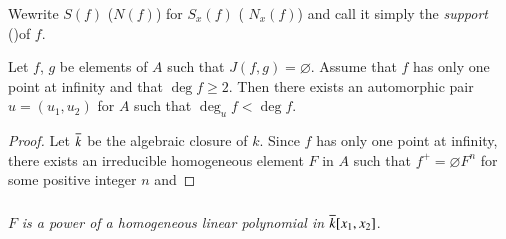 \begin{figure}[H]
\end{figure}
We\pageoriginale write $S(f)$ (\resp $N(f)$) for $S_x (f)$ (\resp
$N_x(f)$) and call it simply the {\em support} ()of $f$.

\setcounter{thm}{1}
\begin{thm}\label{part2:chap6:sec19:thm19.2}   
  Let $f$, $g$ be elements of $A$ such that $J(f, g)=
  \diameter$. Assume that $f$ has only one point at infinity and that
  $\deg f \geq 2$. Then there exists an automorphic pair $u= (u_1,
  u_2)$ for $A$ such that $\deg_u f< \deg f$. 
\end{thm}

\begin{proof}
  Let $\overline{k}$ be the algebraic closure of $k$. Since $f$ has only one
  point at infinity, there exists an irreducible homogeneous element
  $F$ in $A$ such that $f^+= \diameter F^n$ for some positive integer
  $n$ and 
\end{proof}

\setcounter{mysubsection}{2}
\subsubsection{}\label{part2:chap6:sec19:sss19.2.1}   
$F$ \textit{is a power of a homogeneous linear polynomial in}
  $\overline{k}[x_1, x_2]$.

